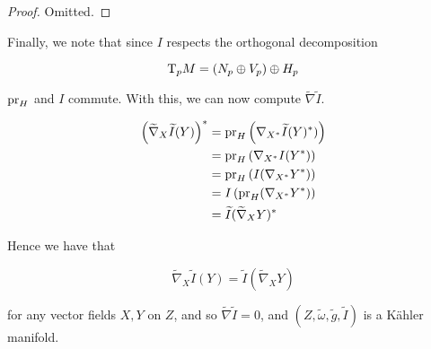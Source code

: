 \documentclass{article}
\renewcommand{\tilde}{\widetilde}
\begin{document}
\begin{proof}
    Omitted.
\end{proof}

Finally, we note that since \(I\) respects the orthogonal decomposition

\[\mathrm{T}_pM = \left(N_p \oplus V_p\right) \oplus H_p\]

\(\operatorname{pr}_H\) and \(I\) commute. With this, we can now compute \(\tilde\nabla\tilde I\).


\begin{align*}
    \left(\tilde\nabla_X\tilde I(Y)\right)^* &= \pr_H\left(\nabla_{X^*}\tilde I(Y)^*)\right) \\
    &= \pr_H\left(\nabla_{X^*}I(Y^*)\right)\\
    &= \pr_H\left(I(\nabla_{X^*}Y^*)\right) \\
    &= I\left(\pr_H(\nabla_{X^*}Y^*)\right) \\
    &= \tilde I(\tilde\nabla_XY)^*
\end{align*}

Hence we have that

\[\tilde\nabla_X\tilde I(Y) = \tilde I(\tilde\nabla_XY)\]

for any vector fields \(X, Y\) on \(Z\), and so \(\tilde\nabla\tilde I = 0\), and \((Z, \tilde\omega, \tilde g, \tilde I)\) is a K\"ahler manifold.
\end{document}
